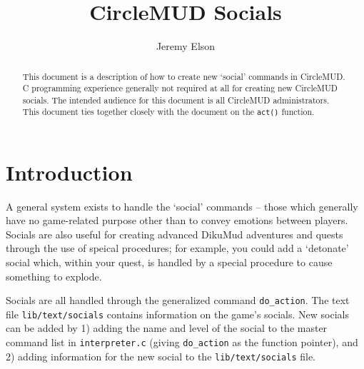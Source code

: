 \documentclass[11pt]{article}
\title{CircleMUD Socials}
\author{Jeremy Elson}
\begin{document}
\maketitle

\begin{abstract}
This document is a description of how to create new `social' commands in CircleMUD. C programming experience generally not required at all for creating new CircleMUD socials.  The intended audience for this document is all CircleMUD administrators.  This document ties together closely with the document on the \texttt{act()} function.
\end{abstract}

\section{Introduction}
A general system exists to handle the `social' commands -- those which generally have no game-related purpose other than to convey emotions between players.   Socials are also useful for creating advanced DikuMud adventures and quests through the use of speical procedures; for example, you could add a `detonate' social which, within your quest, is handled by a special procedure to cause something to explode.
\par
Socials are all handled through the generalized command \texttt{do\_action}.  The
text file \texttt{lib/text/socials} contains information on the game's socials. New socials can be added by 1) adding the name and level of the social to the master command list in \texttt{interpreter.c} (giving \texttt{do\_action} as the function pointer), and 2) adding information for the new social to the \texttt{lib/text/socials} file.
\end{document}
